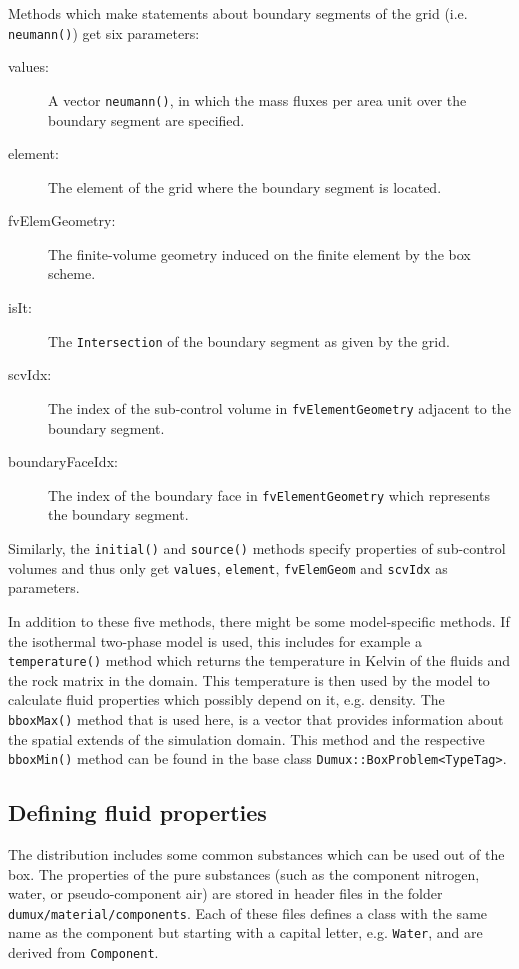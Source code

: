 Methods which make statements about boundary segments of the grid (i.e. 
\texttt{neumann()}) get six parameters:
\begin{description}
\item[values:] A vector \texttt{neumann()}, in which the mass fluxes per area unit
  over the boundary segment are specified.
\item[element:] The element of the grid where the boundary segment
  is located.
\item[fvElemGeometry:] The finite-volume geometry induced on the
  finite element by the box scheme.
\item[isIt:] The \texttt{Intersection} of the boundary
  segment as given by the grid.
\item[scvIdx:] The index of the sub-control volume in
  \texttt{fvElementGeometry} adjacent to the boundary segment.
\item[boundaryFaceIdx:] The index of the boundary face in
  \texttt{fvElementGeometry} which represents the boundary segment.  
\end{description}

Similarly, the \texttt{initial()} and \texttt{source()} methods
specify properties of sub-control volumes and thus only get
\texttt{values}, \texttt{element}, \texttt{fvElemGeom} and
\texttt{scvIdx} as parameters.

In addition to these five methods, there might be some model-specific
methods. If the isothermal two-phase model is used, this includes 
for example a \texttt{temperature()} method which returns the temperature in Kelvin
of the fluids and the rock matrix in the domain. This temperature is
then used by the model to calculate fluid properties which possibly
depend on it, e.g. density. The \texttt{bboxMax()} method that is used here, is a vector
that provides information about the spatial extends of the simulation domain. This method 
and the respective \texttt{bboxMin()} method
can be found in the base class \texttt{Dumux::BoxProblem<TypeTag>}.


\subsection{Defining fluid properties}\label{tutorial-coupled:description-fluid-class}

The \Dumux distribution includes some common substances which can be used
out of the box. The properties of the pure substances (such as the component 
nitrogen, water, or pseudo-component air) are stored in header files in 
the folder \verb+dumux/material/components+. Each of these files 
defines a class with the same name as the component but starting with a capital
letter, e.g. \texttt{Water}, and are derived from \texttt{Component}.

